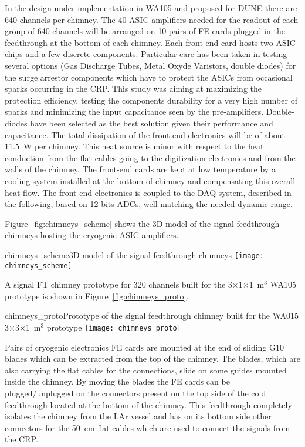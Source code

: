 In the design under implementation in WA105 and proposed for DUNE
there are 640 channels per chimney. The 40 ASIC amplifiers needed for
the readout of each group of 640 channels will be arranged on 10 pairs
of FE cards plugged in the feedthrough at the bottom of each chimney.
Each front-end card hosts two ASIC chips and a few discrete
components. Particular care has been taken in testing several options
(Gas Discharge Tubes, Metal Oxyde Varistors, double diodes) for the
surge arrestor components which have to protect the ASICs from
occasional sparks occurring in the CRP.  This study was aiming at
maximizing the protection efficiency, testing the components
durability for a very high number of sparks and minimizing the input
capacitance seen by the pre-amplifiers. Double-diodes have been
selected as the best solution given their performance and
capacitance. The total dissipation of the front-end electronics will
be of about 11.5~W per chimney. This heat source is minor with respect
to the heat conduction from the flat cables going to the digitization
electronics and from the walls of the chimney. The front-end cards are
kept at low temperature by a cooling system installed at the bottom of
chimney and compensating this overall heat flow. The front-end
electronics is coupled to the DAQ system, described in the following,
based on 12 bits ADCs, well matching the needed dynamic range.

Figure~\ref{fig:chimneys_scheme} shows the 3D model of the signal
feedthrough chimneys hosting the cryogenic ASIC amplifiers.
\begin{cdrfigure}{chimneys_scheme}{3D model of the signal feedthrough chimneys}
\texttt{[image: chimneys\_scheme]}
\end{cdrfigure}
A signal FT chimney prototype for 320 channels built for the
3$\times$1$\times$1~m$^3$ WA105 prototype is shown in
Figure~\ref{fig:chimneys_proto}.
\begin{cdrfigure}{chimneys_proto}{Prototype of the signal feedthrough chimney built for the WA015 3$\times$3$\times$1~m$^3$ prototype}
\texttt{[image: chimneys\_proto]}
\end{cdrfigure}
Pairs of cryogenic electronics FE cards are mounted at the end of
sliding G10 blades which can be extracted from the top of the
chimney. The blades, which are also carrying the flat cables for the
connections, slide on some guides mounted inside the chimney. By
moving the blades the FE cards can be plugged/unplugged on the
connectors present on the top side of the cold feedthrough located at
the bottom of the chimney. This feedthrough completely isolates the
chimney from the LAr vessel and has on its bottom side other
connectors for the 50~cm flat cables which are used to connect the
signals from the CRP.


